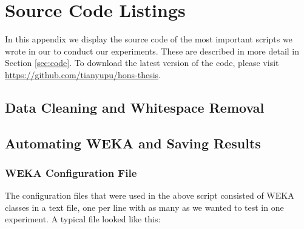 \chapter{Source Code Listings}
\label{app:code}

In this appendix we display the source code of the most important scripts we
wrote in our to conduct our experiments. These are described in more detail
in Section \ref{sec:code}. To download the latest version of the code, please
visit \url{https://github.com/tianyupu/hons-thesis}.


\section{Data Cleaning and Whitespace Removal}
\label{sec:python-preprocess}


\section{Automating WEKA and Saving Results}
\label{sec:run-weka}
\lstset{language=bash}


\subsection{WEKA Configuration File}
The configuration files that were used in the above script consisted of WEKA
classes in a text file, one per line with as many as we wanted to test in one
experiment. A typical file looked like this:



